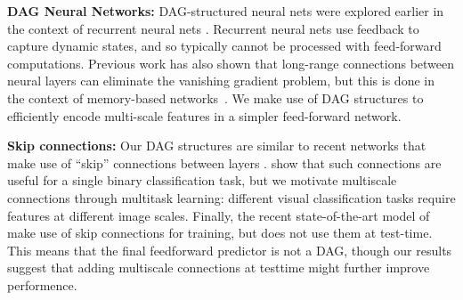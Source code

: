 \documentclass[10pt,twocolumn,letterpaper]{article}
\begin{document}

{\bf DAG Neural Networks:} DAG-structured neural nets were explored earlier in the context of recurrent neural nets \cite{baldi2003principled,graves2009offline}. Recurrent neural nets use feedback to capture dynamic states, and so typically cannot be processed with feed-forward computations. Previous work has also shown that long-range connections between neural layers can eliminate the vanishing gradient problem, but this is done in the context of memory-based networks~\cite{hochreiter1997long}. We make use of DAG structures to efficiently encode multi-scale features in a simpler feed-forward network. 

{\bf Skip connections:} Our DAG structures are similar to recent networks that make use of ``skip'' connections between layers \cite{raiko-aistats-12,szegedy2014going,sermanet2013pedestrian}. \cite{raiko-aistats-12} show that such connections are useful for a single binary classification task, but we motivate multiscale connections through multitask learning: different visual classification tasks require features at different image scales. %
Finally, the recent state-of-the-art model of \cite{szegedy2014going} make use of skip connections for training, but does not use them at test-time. This means that the final feedforward predictor is not a DAG, though our results suggest that adding multiscale connections at testtime might further improve performence.
\end{document}
